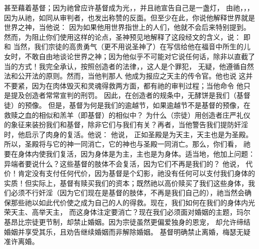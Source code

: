   甚至藉着基督；因为祂曾应许基督成为光，，并且祂宣告自己是一盏灯， 由祂，，，因为从祂，如同从审判者，也发出称赞的反面。但至少在此，你说他解释世界就是世界之神，当他说：  因为如果他用世界指世上的人们，他就不会后来特别提到。然而，为阻止你们使用这样的论点，圣神预见地解释了这段经文的含义，说： 即 和 当然，我们宗徒的高贵勇气（更不用说圣神了）在写信给他在福音中所生的儿女时，不敢自由地谈论世界之神；因为他似乎不可能对它说任何话，除非以直截了当的方式！我完全承认，按照创造者的法律，，这人是个罪犯，  无疑，他遵循自然法和公开法的原则。然而，当他判那人  他成为报应之天主的传令官。他也说  这并不要紧，因为在肉体毁灭和灵魂得救两方面，都有祂的审判过程；当他命令  他只是提及创造者常常宣判的刑罚。  因此，在创造者的规条中，无酵饼是我们（基督徒）的预像。  但是，基督为何是我们的逾越节，如果逾越节不是基督的预像，在救赎之血的相似和羔羊（即基督）的相似中？ 为什么（宗徒）用创造者庄严礼仪的象征来装扮我们和基督，除非它们与我们有关？再者，当他警告我们提防奸淫时，他启示了肉身的复活。他说： 他说，  正如圣殿是为天主，天主也是为圣殿。所以，圣殿将与它的神一同消亡，它的神也与圣殿一同消亡。那么，你们看，  祂要在身体内使我们复活，因为身体是为主，主也是为身体。适当地，他加上问题：  异端者要说什么？这些基督的肢体不会复活，因为它们不再是我们的？ 他说，  代价！肯定没有支付任何代价，因为基督是个幻影，祂没有任何可以支付我们身体的实质！但实际上，基督有赎买我们的资本；既然祂以高价赎买了我们这些身体，我们必须不行奸淫（因为它们现在是基督的肢体，不再是我们自己的），祂当然会确保那些祂以如此代价使之成为自己的人的得救。现在，我们如何在我们的身体内光荣天主、高举天主， 而这身体注定要消亡？现在我们必须面对婚姻的主题，玛尔基昂比宗徒更节制，却禁止婚姻。因为宗徒虽然更偏爱独身的恩宠， 却允许缔结婚姻并享受其乐，且劝告继续婚姻而非解除婚姻。 基督明确禁止离婚，梅瑟无疑准许离婚。\par


